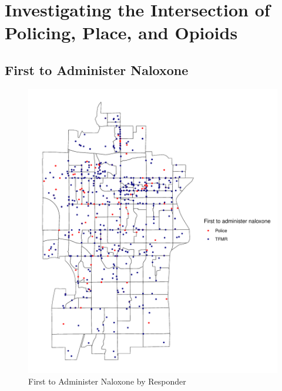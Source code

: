 \chapter{Investigating the Intersection of Policing, Place, and Opioids}
\section{First to Administer Naloxone}
\begin{figure}
    \centering
    \caption{First to Administer Naloxone by Responder}
    \includegraphics{figures/first-to-admin.pdf}
\end{figure}